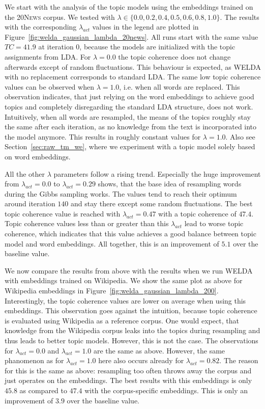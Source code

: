 \documentclass[
        a4paper,
        titlepage,
        twoside,
        parskip
        ]{scrbook}
\theoremstyle{break}
\begin{document}
We start with the analysis of the topic models using the embeddings trained on the \textsc{20News} corpus.
We tested with $\lambda \in \{ 0.0, 0.2, 0.4, 0.5, 0.6, 0.8, 1.0 \}$.
The results with the corresponding $\lambda_{act}$ values in the legend are plotted in Figure~\ref{fig:welda_gaussian_lambda_20news}.
All runs start with the same value $TC = 41.9$ at iteration 0, because the models are initialized with the topic assignments from LDA.
For $\lambda = 0.0$ the topic coherence does not change afterwards except of random fluctuations.
This behaviour is expected, as WELDA with no replacement corresponds to standard LDA.
The same low topic coherence values can be observed when $\lambda = 1.0$, i.e. when all words are replaced.
This observation indicates, that just relying on the word embeddings to achieve good topics and completely disregarding the standard LDA structure, does not work.
Intuitively, when all words are resampled, the means of the topics roughly stay the same after each iteration, as no knowledge from the text is incorporated into the model anymore.
This results in roughly constant values for $\lambda = 1.0$.
Also see Section~\ref{sec:raw_tm_we}, where we experiment with a topic model solely based on word embeddings.

All the other $\lambda$ parameters follow a rising trend.
Especially the huge improvement from $\lambda_{act} = 0.0$ to $\lambda_{act} = 0.29$ shows, that the base idea of resampling words during the Gibbs sampling works.
The values tend to reach their optimum around iteration $140$ and stay there except some random fluctuations.
The best topic coherence value is reached with $\lambda_{act} = 0.47$ with a topic coherence of $47.4$.
Topic coherence values less than or greater than this $\lambda_{act}$ lead to worse topic coherence, which indicates that this value achieves a good balance between topic model and word embeddings.
All together, this is an improvement of $5.1$ over the baseline value.

We now compare the results from above with the results when we run WELDA with embeddings trained on Wikipedia.
We show the same plot as above for Wikipedia embeddings in Figure~\ref{fig:welda_gaussian_lambda_200}.
Interestingly, the topic coherence values are lower on average when using this embeddings.
This observation goes against the intuition, because topic coherence is evaluated using Wikipedia as a reference corpus.
One would expect, that knowledge from the Wikipedia corpus leaks into the topics during resampling and thus leads to better topic models.
However, this is not the case.
The observations for $\lambda_{act} = 0.0$ and $\lambda_{act} = 1.0$ are the same as above.
However, the same phanomenon as for $\lambda_{act} = 1.0$ here also occurs already for $\lambda_{act} = 0.82$.
The reason for this is the same as above: resampling too often throws away the corpus and just operates on the embeddings.
The best results with this embeddings is only $45.8$ as compared to $47.4$ with the corpus-specific embeddings.
This is only an improvement of $3.9$ over the baseline value.
\end{document}
